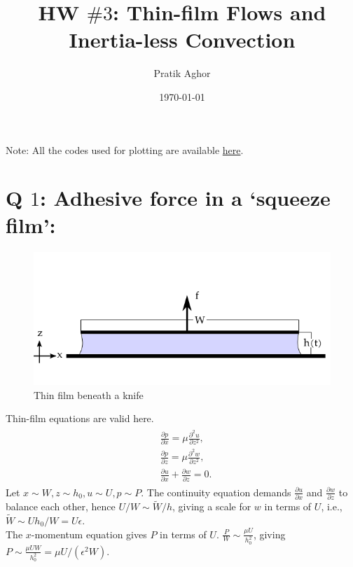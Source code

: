 \documentclass{article}
\author{Pratik Aghor}
\title{HW $\# 3$: Thin-film Flows and Inertia-less Convection}
\date{\today}  %
\begin{document}
\maketitle
Note: All the codes used for plotting are available \href{https://github.com/PratikAghor/lec_notes/tree/master/fluid_dynamics/hw3_fluid_dyn_PratikAgor/codes                                  
}{here}.
\section{Q $1$: Adhesive force in a ‘squeeze film’:}
\begin{figure}[H]
    \centering
    \includegraphics[scale = 0.5]{Figs/thin_film_knife.png}
    \caption{Thin film beneath a knife}
    \label{fig:thin_film_knife}
\end{figure}

Thin-film equations are valid here.
\begin{align}\label{eq:thin_film_dim}
 \begin{split}
  & \frac{\partial p}{\partial x} = \mu\frac{\partial^{2}u}{\partial z^{2}},\\
  & \frac{\partial p}{\partial z} = \mu\frac{\partial^{2}w}{\partial z^{2}},\\
  & \frac{\partial u}{\partial x} + \frac{\partial w}{\partial z} = 0.
 \end{split}
\end{align}
Let $x\sim W, z \sim h_{0}, u \sim U, p \sim P$. The continuity equation demands $\frac{\partial u}{\partial x}$ and $\frac{\partial w}{\partial z}$ to balance each other, hence $U/W \sim \tilde{W}/h$, giving a scale for $w$ in terms of $U$, i.e., $\tilde{W} \sim Uh_{0}/W = U\epsilon$.\\
The $x$-momentum equation gives $P$ in terms of $U$. 
$\frac{P}{W} \sim \frac{\mu U}{h_{0}^{2}}$, giving $P \sim \frac{\mu U W}{h_{0}^{2}} = \mu U/(\epsilon^{2}W)$.
\end{document}
